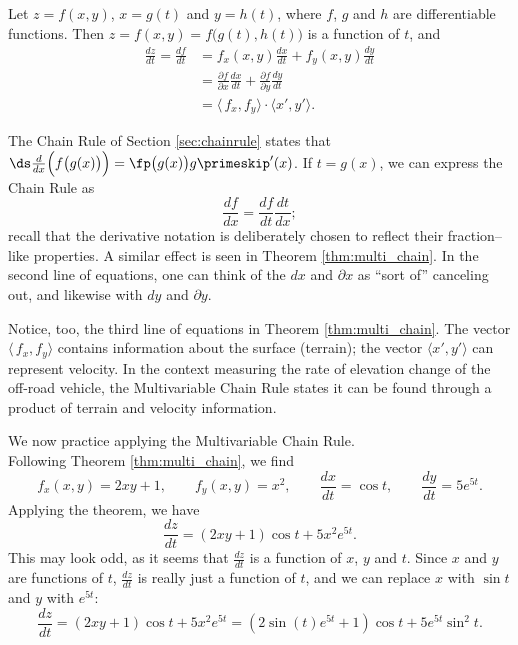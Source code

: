 {Let $z=f(x,y)$, $x=g(t)$ and $y=h(t)$, where $f$, $g$ and $h$ are differentiable functions. Then $z = f(x,y) = f\big(g(t),h(t)\big)$ is a function of $t$, and 
\begin{align*}
\frac{dz}{dt} = \frac{df}{dt} &= f_x(x,y)\frac{dx}{dt}+f_y(x,y)\frac{dy}{dt}\\[5pt]
		&= \frac{\partial f}{\partial x}\frac{dx}{dt}+\frac{\partial f}{\partial y}\frac{dy}{dt}\\
		&= \langle\, f_x,f_y\rangle \cdot \langle x',y'\rangle.
\end{align*}
}

The Chain Rule of Section \ref{sec:chainrule} states that $\ds \frac{d}{dx}\Big(f\big(g(x)\big)\Big) = \fp\big(g(x)\big)g\primeskip'(x)$. If $t=g(x)$, we can express the Chain Rule as 
$$\frac{df}{dx} = \frac{df}{dt}\frac{dt}{dx};$$
recall that the derivative notation is deliberately chosen to reflect their fraction--like properties. A similar effect is seen in Theorem \ref{thm:multi_chain}. In the second line of equations, one can think of the $dx$ and $\partial x$ as ``sort of'' canceling out, and likewise with $dy$ and $\partial y$. 



Notice, too, the third line of equations in Theorem \ref{thm:multi_chain}. The vector $\langle\,f_x,f_y\rangle$ contains information about the surface (terrain); the vector $\langle x',y'\rangle$ can represent velocity. In the context measuring the rate of elevation change of the off-road vehicle, the Multivariable Chain Rule states it can be found through a product of terrain and velocity information.


We now practice applying the Multivariable Chain Rule.\\

{Following Theorem \ref{thm:multi_chain}, we find
$$f_x(x,y) = 2xy+1,\qquad f_y(x,y) = x^2,\qquad \frac{dx}{dt} = \cos t,\qquad \frac{dy}{dt}= 5e^{5t}.$$
Applying the theorem, we have
$$\frac{dz}{dt} = (2xy+1)\cos t+ 5x^2e^{5t}.$$
This may look odd, as it seems that $\frac{dz}{dt}$ is a function of $x$, $y$ and $t$. Since $x$ and $y$ are functions of $t$, $\frac{dz}{dt}$ is really just a function of $t$, and we can replace $x$ with $\sin t$ and $y$ with $e^{5t}$:
$$\frac{dz}{dt} = (2xy+1)\cos t+ 5x^2e^{5t} = (2\sin (t)e^{5t}+1)\cos t+5e^{5t}\sin^2t.$$
\baselineskip
}\\

